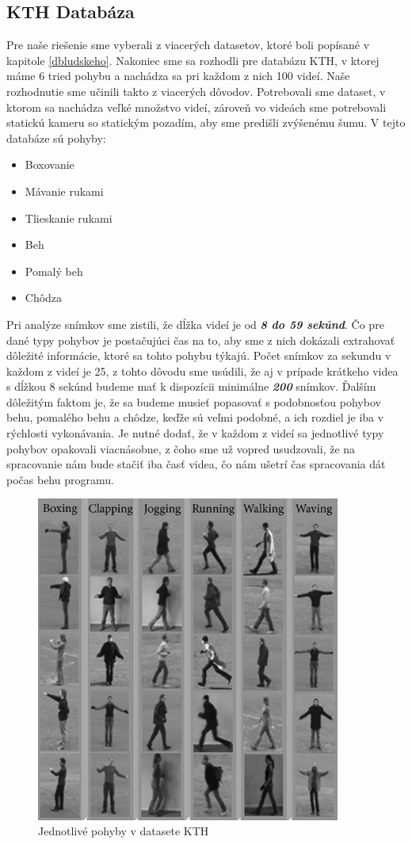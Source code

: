 \subsection{KTH Databáza}
Pre naše riešenie sme vyberali z viacerých datasetov, ktoré boli popísané v kapitole \ref{dbludskeho}. Nakoniec sme sa rozhodli pre databázu KTH, v ktorej máme 6 tried pohybu a nachádza sa pri každom z nich 100 videí. Naše rozhodnutie sme učinili takto z viacerých dôvodov. Potrebovali sme dataset, v ktorom sa nachádza veľké množstvo videí, zároveň vo videách sme potrebovali statickú kameru so statickým pozadím, aby sme predišli zvýšenému šumu. V tejto databáze sú pohyby:

\begin{itemize}
\item Boxovanie
\item Mávanie rukami
\item Tlieskanie rukami
\item Beh
\item Pomalý beh
\item Chôdza
\end{itemize}

Pri analýze snímkov sme zistili, že dĺžka videí je od \textit{\textbf{8 do 59 sekúnd}}. Čo pre dané typy pohybov je postačujúci čas na to, aby sme z nich dokázali extrahovať dôležité informácie, ktoré sa tohto pohybu týkajú.  Počet snímkov za sekundu v každom z videí je 25, z tohto dôvodu sme usúdili, že aj v prípade krátkeho videa s dĺžkou 8 sekúnd budeme mať k dispozícii minimálne \textit{\textbf{200}} snímkov. Ďalším dôležitým faktom je, že sa budeme musieť popasovať s podobnosťou pohybov behu, pomalého behu a chôdze, keďže sú veľmi podobné, a ich rozdiel je iba v rýchlosti vykonávania. Je nutné dodať, že v každom z videí sa jednotlivé typy pohybov opakovali viacnásobne, z čoho sme už vopred usudzovali, že na spracovanie nám bude stačiť iba časť videa, čo nám ušetrí čas spracovania dát počas behu programu. 

\begin{figure}[H]
  \centering
  \includegraphics[width=10cm]{img/KTHdataset.png}
  \caption{Jednotlivé pohyby v datasete KTH \cite{c14}}
  \label{KTHobr}
\end{figure}


